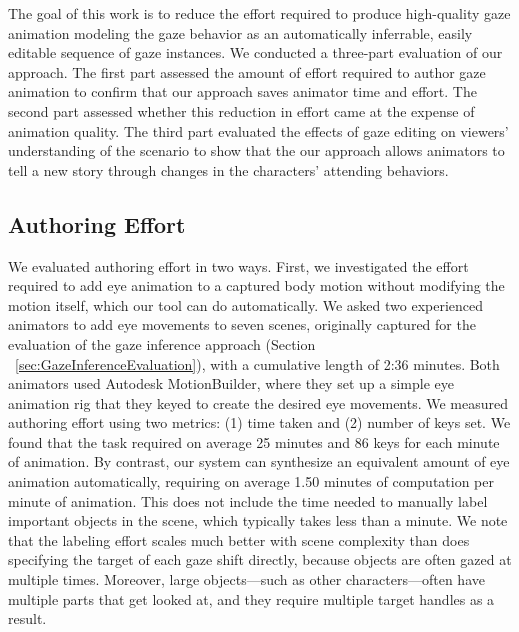 The goal of this work is to reduce the effort required to produce high-quality gaze animation modeling the gaze behavior as an automatically inferrable, easily editable sequence of gaze instances.
We conducted a three-part evaluation of our approach. The first part assessed the amount of effort required to author gaze animation to confirm that our approach saves animator time and effort. The second part assessed whether this reduction in effort came at the expense of animation quality. The third part evaluated the effects of gaze editing on viewers' understanding of the scenario to show that the our approach allows animators to tell a new story through changes in the characters' attending behaviors.

\subsection{Authoring Effort}
\label{sec:GazeAuthoringEffortEvaluation}

We evaluated authoring effort in two ways. First, we investigated the effort required to add eye animation to a captured body motion without modifying the motion itself, which our tool can do automatically. We asked two experienced animators to add eye movements to seven scenes, originally captured for the evaluation of the gaze inference approach (Section ~\ref{sec:GazeInferenceEvaluation}), with a cumulative length of 2:36 minutes. Both animators used Autodesk MotionBuilder, where they set up a simple eye animation rig that they keyed to create the desired eye movements. We measured authoring effort using two metrics: (1) time taken and (2) number of keys set. We found that the task required on average 25 minutes and 86 keys for each minute of animation. By contrast, our system can synthesize an equivalent amount of eye animation automatically, requiring on average 1.50 minutes of computation per minute of animation. This does not include the time needed to manually label important objects in the scene, which typically takes less than a minute.
We note that the labeling effort scales much better with scene complexity than does specifying the target of each gaze shift directly, because objects are often gazed at multiple times. Moreover, large objects---such as other characters---often have multiple parts that get looked at, and they require multiple target handles as a result.

